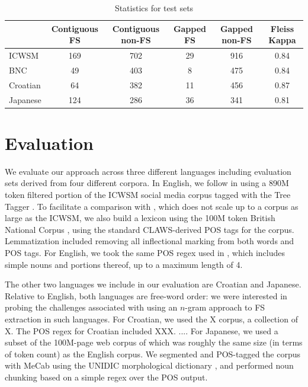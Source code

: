 \documentclass[11pt,letterpaper]{article}
\begin{document}
\begin{table}[!bt]
 
 \begin{center}
  \caption{ Statistics for test sets}
	 \label{tab:stats}
	 \begin{tabular}{lccccc}

       \hline
			& Contiguous FS & Contiguous non-FS & Gapped FS & Gapped non-FS & Fleiss Kappa\\
			 \hline
			ICWSM & 169 & 702 & 29 & 916& 0.84 \\
			BNC & 49 & 403 & 8 & 475 & 0.84 \\
			Croatian & 64 & 382 & 11 & 456 & 0.87 \\
			Japanese & 124 & 286 & 36 & 341 & 0.81\\
       \hline
 \end{tabular}

 \end{center}

 \end{table}	

\section{Evaluation} \label{sec:evaluation}

We evaluate our approach across three different languages including evaluation sets derived from four different corpora. In English, we follow  in using a 890M token filtered portion of the ICWSM social media corpus \cite{ICWSM} tagged with the Tree Tagger \cite{Schmid95}. To facilitate a comparison with , which does not scale up to a corpus as large as the ICWSM, we also build a lexicon using the 100M token British National Corpus \cite{BNC}, using the standard CLAWS-derived POS tags for the corpus. Lemmatization included removing all inflectional marking from both words and POS tags. For English, we took the same POS regex used in , which includes simple nouns and portions thereof, up to a maximum length of 4.

The other two languages we include in our evaluation are Croatian and Japanese. Relative to English, both languages are free-word order: we were interested in probing the challenges associated with using an $n$-gram approach to FS extraction in such languages. For Croatian, we used the X corpus, a collection of X. The POS regex for Croatian included XXX. .... For Japanese, we used a subset of the 100M-page web corpus of  which was roughly the same size (in terms of token count) as the English corpus. We segmented and POS-tagged the corpus with MeCab \cite{Kudo:2008} using the UNIDIC morphological dictionary \cite{Den:2007}, and performed noun chunking based on a simple regex over the POS output.
\end{document}
